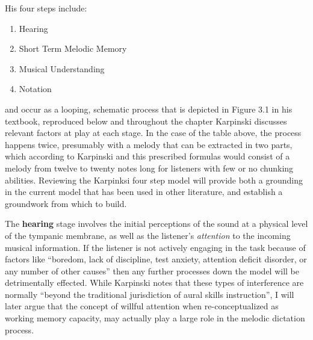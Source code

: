 \documentclass[]{book}
\providecommand{\tightlist}{%
  \setlength{\itemsep}{0pt}\setlength{\parskip}{0pt}}
\theoremstyle{definition}
\theoremstyle{definition}
\theoremstyle{definition}
\theoremstyle{remark}
\begin{document}
His four steps include:

\begin{enumerate}
\def\labelenumi{\arabic{enumi}.}
\tightlist
\item
  Hearing
\item
  Short Term Melodic Memory
\item
  Musical Understanding
\item
  Notation
\end{enumerate}

and occur as a looping, schematic process that is depicted in Figure 3.1
in his textbook, reproduced below and throughout the chapter Karpinski
discusses relevant factors at play at each stage. In the case of the
table above, the process happens twice, presumably with a melody that
can be extracted in two parts, which according to Karpinski and this
prescribed formulas would consist of a melody from twelve to twenty
notes long for listeners with few or no chunking abilities. Reviewing
the Karpinksi four step model will provide both a grounding in the
current model that has been used in other literature, and establish a
groundwork from which to build.

The \textbf{hearing} stage involves the initial perceptions of the sound
at a physical level of the tympanic membrane, as well as the listener's
\emph{attention} to the incoming musical information. If the listener is
not actively engaging in the task because of factors like ``boredom,
lack of discipline, test anxiety, attention deficit disorder, or any
number of other causes'' then any further processes down the model will
be detrimentally effected. While Karpinski notes that these types of
interference are normally ``beyond the traditional jurisdiction of aural
skills instruction'', I will later argue that the concept of willful
attention when re-conceptualized as working memory capacity, may
actually play a large role in the melodic dictation process.
\end{document}
